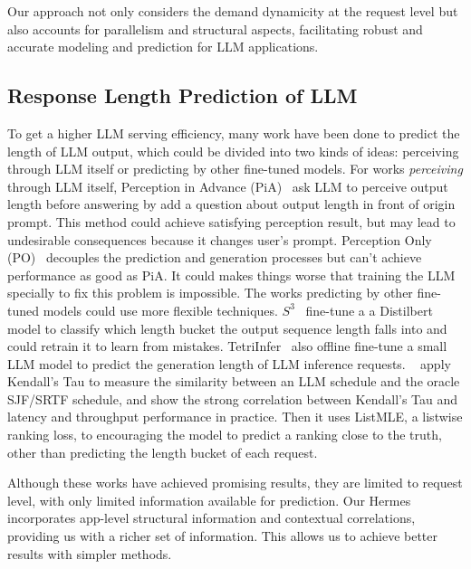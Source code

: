 Our approach not only considers the demand dynamicity at the request level but also accounts for parallelism and structural aspects, facilitating robust and accurate modeling and prediction for LLM applications.


\subsection{Response Length Prediction of LLM}

To get a higher LLM serving efficiency, many work have been done to predict the length of LLM output, which could be divided into two kinds of ideas: perceiving through LLM itself or predicting by other fine-tuned models. For works \emph{perceiving} through LLM itself, Perception in Advance (PiA)~\cite{zheng2024response} ask LLM to perceive output length before answering by add a question about output length in front of origin prompt. This method could achieve satisfying perception result, but may lead to undesirable consequences because it changes user's prompt. Perception Only (PO)~\cite{zheng2024response} decouples the prediction and generation processes but can't achieve performance as good as PiA. It could makes things worse that training the LLM specially to fix this problem is impossible. The works predicting by other fine-tuned models could use more flexible techniques. $S^3$~\cite{jin2023s} fine-tune a a Distilbert model to classify which length bucket the output sequence length falls into and could retrain it to learn from mistakes. TetriInfer~\cite{hu2024inference} also offline fine-tune a small LLM model to predict the generation length of LLM inference requests. ~\cite{fu2024efficient} apply Kendall’s Tau to measure the similarity between an LLM schedule and the oracle SJF/SRTF schedule, and show the strong correlation between Kendall’s Tau and  latency and throughput performance in practice. Then it uses ListMLE, a listwise ranking loss, to encouraging the model to predict a ranking close to the truth, other than predicting the length bucket of each request. 

Although these works have achieved promising results, they are limited to request level, with only limited information available for prediction. Our Hermes incorporates app-level structural information and contextual correlations, providing us with a richer set of information. This allows us to achieve better results with simpler methods.

